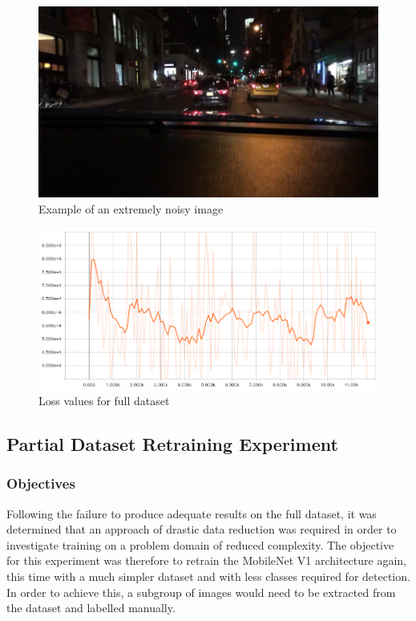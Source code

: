 \documentclass[12pt]{report}
\begin{document}
\vspace{0.5cm}
\begin{figure}[h]
	\centering
	\includegraphics[width=12cm]{noisy}
	\caption{Example of an extremely noisy image}
	\label{fig:noisy}
\end{figure}

\vspace{0.5cm}
\begin{figure}[h]
	\centering
	\includegraphics[width=12cm]{mobilenet-full-dataset-loss}
	\caption{Loss values for full dataset}
	\label{fig:mobilenet-full-dataset-loss}
\end{figure}

\subsection{Partial Dataset Retraining Experiment}
\subsubsection{Objectives}
\begin{flushleft}
Following the failure to produce adequate results on the full dataset, it was determined that an approach of drastic data reduction was required in order to investigate training on a problem domain of reduced complexity. The objective for this experiment was therefore to retrain the MobileNet V1 architecture again, this time with a much simpler dataset and with less classes required for detection. In order to achieve this, a subgroup of images would need to be extracted from the dataset and labelled manually.
\end{flushleft}
\end{document}
